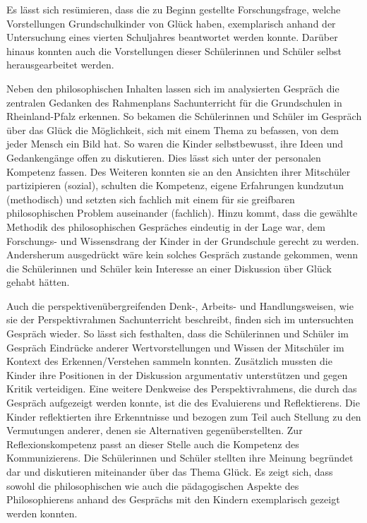 Es lässt sich resümieren, dass die zu Beginn gestellte Forschungsfrage, welche Vorstellungen Grundschulkinder von Glück haben, exemplarisch anhand der Untersuchung eines vierten Schuljahres beantwortet werden konnte. 
Darüber hinaus konnten auch die Vorstellungen dieser Schülerinnen und Schüler selbst herausgearbeitet werden. 

Neben den philosophischen Inhalten lassen sich im analysierten Gespräch die zentralen Gedanken des Rahmenplans Sachunterricht für die Grundschulen in Rheinland-Pfalz erkennen.
So bekamen die Schülerinnen und Schüler im Gespräch über das Glück die Möglichkeit, sich mit einem Thema zu befassen, von dem jeder Mensch ein Bild hat.
So waren die Kinder selbstbewusst, ihre Ideen und Gedankengänge offen zu diskutieren.
Dies lässt sich unter der personalen Kompetenz fassen.
Des Weiteren konnten sie an den Ansichten ihrer Mitschüler partizipieren (sozial), schulten die Kompetenz, eigene Erfahrungen kundzutun (methodisch) und setzten sich fachlich mit einem für sie greifbaren philosophischen Problem auseinander (fachlich).
Hinzu kommt, dass die gewählte Methodik des philosophischen Gespräches eindeutig in der Lage war, dem Forschungs- und Wissensdrang der Kinder in der Grundschule gerecht zu werden.
Andersherum ausgedrückt wäre kein solches Gespräch zustande gekommen, wenn die Schülerinnen und Schüler kein Interesse an einer Diskussion über Glück gehabt hätten.

Auch die perspektivenübergreifenden Denk-, Arbeits- und Handlungsweisen, wie sie der Perspektivrahmen Sachunterricht beschreibt, finden sich im untersuchten Gespräch wieder.
So lässt sich festhalten, dass die Schülerinnen und Schüler im Gespräch Eindrücke anderer Wertvorstellungen und Wissen der Mitschüler im Kontext des Erkennen/Verstehen sammeln konnten.
Zusätzlich mussten die Kinder ihre Positionen in der Diskussion argumentativ unterstützen und gegen Kritik verteidigen.
Eine weitere Denkweise des Perspektivrahmens, die durch das Gespräch aufgezeigt werden konnte, ist die des Evaluierens und Reflektierens. 
Die Kinder reflektierten ihre Erkenntnisse und bezogen zum Teil auch Stellung zu den Vermutungen anderer, denen sie Alternativen gegenüberstellten.
Zur Reflexionskompetenz passt an dieser Stelle auch die Kompetenz des Kommunizierens.
Die Schülerinnen und Schüler stellten ihre Meinung begründet dar und diskutieren miteinander über das Thema \glqq Glück\grqq{}.
Es zeigt sich, dass sowohl die philosophischen wie auch die pädagogischen Aspekte des Philosophierens anhand des Gesprächs mit den Kindern exemplarisch gezeigt werden konnten.

